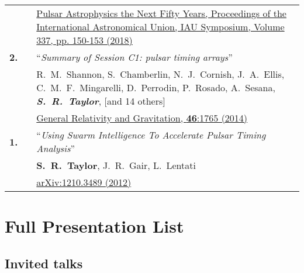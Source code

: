 \documentclass[11pt,letterpaper,sans]{moderncv}
\begin{document}
{\begin{longtable}{rp{0.3cm}p{15.8cm}}
&& \href{https://doi.org/10.1017/S1743921317009711}{{\color{color1} Pulsar Astrophysics the Next Fifty Years, Proceedings of the International Astronomical Union, IAU Symposium, Volume 337, pp. 150-153 (2018)}} \vspace{0.09cm}\\
\textbf{2.} & & ``\textit{Summary of Session C1: pulsar timing arrays}'' \\ 
&& R.~M.~Shannon, S.~Chamberlin, N.~J.~Cornish, J.~A.~Ellis, C.~M.~F.~Mingarelli, D.~Perrodin, P.~Rosado, A.~Sesana, \textit{\textbf{S.~R.~Taylor}}, [and 14 others] \\ 
&& \href{http://link.springer.com/article/10.1007\%2Fs10714-014-1765-4}{{\color{color1} General Relativity and Gravitation, \textbf{46}:1765 (2014)}} \vspace{0.09cm}\\
\textbf{1.} & & ``\textit{Using Swarm Intelligence To Accelerate Pulsar Timing Analysis}'' \\ 
&& \textbf{S.~R.~Taylor}, J.~R.~Gair, L.~Lentati \\ 
&& \href{https://arxiv.org/abs/1210.3489}{{\color{color1} arXiv:1210.3489 (2012)}} \vspace{0.09cm}\\
\end{longtable}
}


\pagebreak
\section{Full Presentation List}
\subsection{Invited talks} \vspace{-0.6cm}
\end{document}
